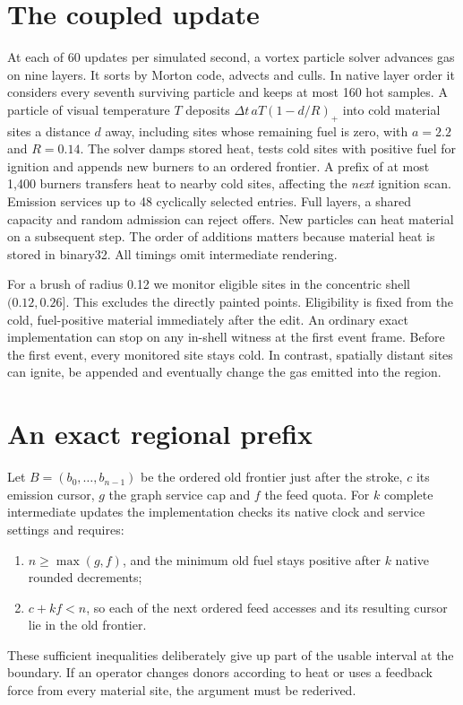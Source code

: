 \documentclass[acmtog,anonymous,review]{acmart}
\begin{document}
\section{The coupled update}
At each of 60 updates per simulated second, a vortex particle solver advances gas on nine layers. It sorts by Morton code, advects and culls. In native layer order it considers every seventh surviving particle and keeps at most 160 hot samples. A particle of visual temperature $T$ deposits $\Delta t\,aT(1-d/R)_+$ into cold material sites a distance $d$ away, including sites whose remaining fuel is zero, with $a=2.2$ and $R=0.14$. The solver damps stored heat, tests cold sites with positive fuel for ignition and appends new burners to an ordered frontier. A prefix of at most 1,400 burners transfers heat to nearby cold sites, affecting the \emph{next} ignition scan. Emission services up to 48 cyclically selected entries. Full layers, a shared capacity and random admission can reject offers. New particles can heat material on a subsequent step. The order of additions matters because material heat is stored in binary32. All timings omit intermediate rendering.

For a brush of radius 0.12 we monitor eligible sites in the concentric shell $(0.12,0.26]$. This excludes the directly painted points. Eligibility is fixed from the cold, fuel-positive material immediately after the edit. An ordinary exact implementation can stop on any in-shell witness at the first event frame. Before the first event, every monitored site stays cold. In contrast, spatially distant sites can ignite, be appended and eventually change the gas emitted into the region.

\section{An exact regional prefix}
Let $B=(b_0,\ldots,b_{n-1})$ be the ordered old frontier just after the stroke, $c$ its emission cursor, $g$ the graph service cap and $f$ the feed quota. For $k$ complete intermediate updates the implementation checks its native clock and service settings and requires:
\begin{enumerate}
\item $n\ge\max(g,f)$, and the minimum old fuel stays positive after $k$ native rounded decrements;
\item $c+k f<n$, so each of the next ordered feed accesses and its resulting cursor lie in the old frontier.
\end{enumerate}
These sufficient inequalities deliberately give up part of the usable interval at the boundary. If an operator changes donors according to heat or uses a feedback force from every material site, the argument must be rederived.
\end{document}
